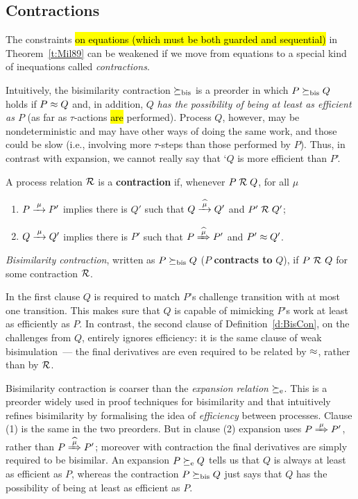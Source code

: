 \subsection{Contractions}
\label{s:mcontr}

The constraints \hl{on equations (which must be both guarded and
sequential)} in Theorem~\ref{t:Mil89} can be
weakened if we move from equations to a special kind of inequations called
  \emph{contractions}.

Intuitively, the bisimilarity contraction $\mathrel{\succeq_{\rm{bis}}}$ is a preorder in which 
$P \mathrel{\succeq_{\rm{bis}}} Q  $  holds  if $P \approx Q$ and, in addition, 
$Q$ \emph{has the possibility of being at least as efficient as $P$} (as far as
$\tau$-actions \hl{are} performed). 
Process $Q$, however, may be nondeterministic and may have other ways
of doing the same work, and those could be slow (i.e., involving
more $\tau$-steps than those performed by $P$).
Thus, in contrast with expansion, we cannot really say that `$Q$ is more efficient than
$P$'.

\begin{definition}%
\label{d:BisCon}
A process relation ${{\cal R}}$ 
 is a \textbf{contraction} if, whenever
 $P\mathrel{\cal R} Q$, for all $\mu$
\begin{enumerate}
\item $P \arr\mu P'$ implies there is $Q'$ such that $Q \arcap \mu
  Q'$ and $P' \mathrel{\cal R} Q'$;
\item $Q \arr\mu Q'$   implies there is $P'$ such that $P \Arcap \mu
 P'$ and $P' \approx Q'$\enspace.
\end{enumerate}
\emph{Bisimilarity contraction}, written as $P \mathrel{\succeq_{\rm{bis}}} Q$ ($P$
\textbf{contracts to} $Q$), if $P\ {\cal R}\ Q$ for some contraction ${\cal R}$.
\end{definition}

In the first clause $Q$ is required to match $P$'s challenge
transition with at most one transition.
This makes sure that $Q$ is capable of mimicking $P$'s
work at least as efficiently as $P$. 
In contrast, the second clause of Definition~\ref{d:BisCon}, on the
challenges from $Q$, entirely ignores efficiency: it is the same
clause of  weak bisimulation~--- the final derivatives are even required
to be related  by $\approx$, rather than by ${\cal R}$.

Bisimilarity contraction is coarser than 
 the \emph{expansion relation} $\mathrel{\succeq_{\rm{e}}}$.
This is a preorder widely used in proof techniques for bisimilarity and that 
intuitively refines bisimilarity by 
 formalising the idea of \emph{efficiency} between processes.
Clause (1) is the same in the two
preorders. But in clause (2) expansion uses 
$P \Arr \mu P'$, rather than $P \Arcap \mu P'$; 
 moreover with
contraction the final derivatives are simply required to be bisimilar.
An expansion 
$P \mathrel{\succeq_{\rm{e}}} Q$
tells us  that $Q$ is always at least as efficient as $P$, whereas  the
 contraction $P \mathrel{\succeq_{\rm{bis}}} Q$  just says that $Q$ has the  possibility of
being at least as efficient as $P$. 

